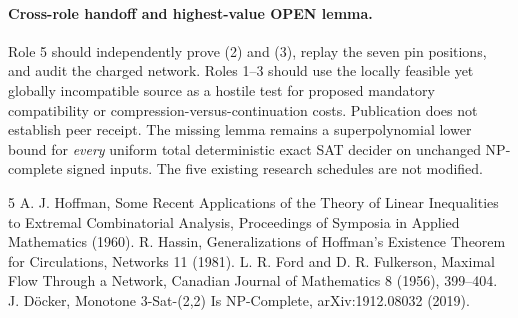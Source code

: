 \documentclass[11pt]{article}
\begin{document}
\paragraph{Cross-role handoff and highest-value OPEN lemma.}
Role 5 should independently prove (2) and (3), replay the seven pin positions, and audit the charged network. Roles 1--3 should use the locally feasible yet globally incompatible source as a hostile test for proposed mandatory compatibility or compression-versus-continuation costs. Publication does not establish peer receipt. The missing lemma remains a superpolynomial lower bound for \emph{every} uniform total deterministic exact SAT decider on unchanged NP-complete signed inputs. The five existing research schedules are not modified.
\begin{thebibliography}{5}
 A. J. Hoffman, Some Recent Applications of the Theory of Linear Inequalities to Extremal Combinatorial Analysis, Proceedings of Symposia in Applied Mathematics (1960).
 R. Hassin, Generalizations of Hoffman's Existence Theorem for Circulations, Networks 11 (1981).
 L. R. Ford and D. R. Fulkerson, Maximal Flow Through a Network, Canadian Journal of Mathematics 8 (1956), 399--404.
 J. D\"ocker, Monotone 3-Sat-(2,2) Is NP-Complete, arXiv:1912.08032 (2019).
\end{thebibliography}
\end{document}
